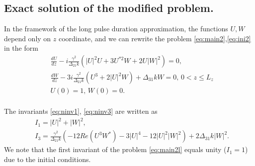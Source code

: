 \documentclass[a4paper, 12pt, onecolumn]{extarticle}
\begin{document}
\subsection*{Exact solution of the modified problem.}
In the framework of the long pulse duration approximation, the functions \(U,W\) depend only on \(z\) coordinate, and we can rewrite the problem \eqref{eq:main2},\eqref{eq:ini2} in the form
\begin{equation}
\label{eq:main2l}
\begin{aligned}
&\frac{dU}{dz}-i\frac{\gamma^2}{\Delta_{21} k}(|U|^2U+3U^{*2}W+2U|W|^2)=0,\\
&\frac{dW}{dz}-3i\frac{\gamma^2}{\Delta_{21} k}(U^3+2|U|^2W)+\Delta_{31}kW=0,\,  0< z \leq L_z\\
&U(0)=1,\,W(0)=0.\\
\end{aligned}
\end{equation}

The invariants \eqref{eq:ninv1}, \eqref{eq:ninv3} are written as
\begin{equation}
\label{eq:ninvs}
\begin{aligned}
&I_1=|U|^2+|W|^2,\\
&I_3=\frac{\gamma^2}{\Delta_{21}k}\left(-12Re(U^3W^*)-3|U|^4-12|U|^2|W|^2\right)+2\Delta_{31}k|W|^2.
\end{aligned}
\end{equation}
We note that the first invariant of the problem \eqref{eq:main2l} equals unity (\(I_1=1\)) due to the initial conditions.
\end{document}
